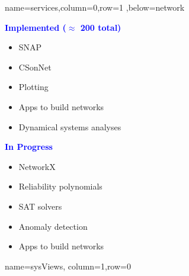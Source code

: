 \documentclass[landscape,paperwidth=70in,paperheight=46in,fontscale=0.225]{baposter} %
\begin{document}
\begin{poster}
          {name=services,column=0,row=1 ,below=network}{
\begin{minipage}[t]{0.48 \textwidth}
\textcolor{blue}{\textbf{Implemented ($\approx$ 200 total)}}
\medskip
\begin{itemize}[leftmargin=*,noitemsep,topsep=0pt]
    \item SNAP  \smallskip
    \item CSonNet   \smallskip 
    \item Plotting  \smallskip
    \item Apps to build networks  \smallskip
    \item Dynamical systems analyses
\end{itemize}
\end{minipage}
\quad
\begin{minipage}[t]{0.48 \textwidth}
\textcolor{blue}{\textbf{In Progress}}\
  \medskip
\begin{itemize}[leftmargin=*,noitemsep,topsep=0pt]
    \item NetworkX    \smallskip
    \item Reliability polynomials    \smallskip
    \item SAT solvers    \smallskip
    \item Anomaly detection     \smallskip
    \item Apps to build networks    \smallskip
\end{itemize}
\end{minipage}
}


          {name=sysViews, column=1,row=0}{

}
\end{poster}
\end{document}
